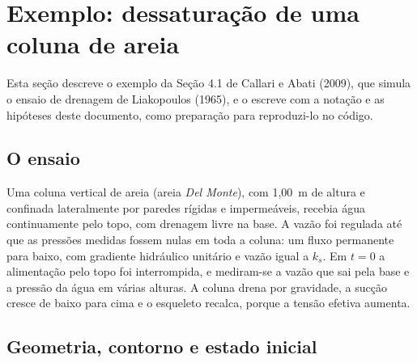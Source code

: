 \documentclass[11pt,a4paper]{article}
\begin{document}
\section{Exemplo: dessaturação de uma coluna de areia}
\label{sec:liakopoulos}

Esta seção descreve o exemplo da Seção 4.1 de Callari e Abati (2009), que simula o ensaio
de drenagem de Liakopoulos (1965), e o escreve com a notação e as hipóteses deste
documento, como preparação para reproduzi-lo no código.

\subsection{O ensaio}
Uma coluna vertical de areia (areia \emph{Del Monte}), com 1,00~m de altura e confinada
lateralmente por paredes rígidas e impermeáveis, recebia água continuamente pelo topo, com
drenagem livre na base. A vazão foi regulada até que as pressões medidas fossem nulas em
toda a coluna: um fluxo permanente para baixo, com gradiente hidráulico unitário e vazão
igual a $k_s$. Em $t=0$ a alimentação pelo topo foi interrompida, e mediram-se a vazão que
sai pela base e a pressão da água em várias alturas. A coluna drena por gravidade, a sucção
cresce de baixo para cima e o esqueleto recalca, porque a tensão efetiva aumenta.

\subsection{Geometria, contorno e estado inicial}
\end{document}
